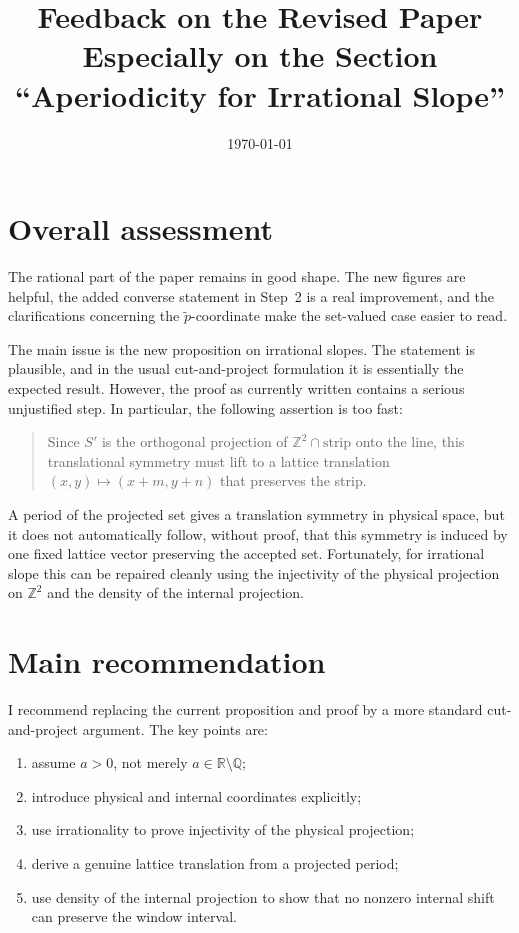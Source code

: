\documentclass[11pt]{article}
\title{Feedback on the Revised Paper\\
\large Especially on the Section ``Aperiodicity for Irrational Slope''}
\author{}
\date{\today}
\begin{document}
\maketitle

\section*{Overall assessment}

The rational part of the paper remains in good shape.  The new figures are
helpful, the added converse statement in Step~2 is a real improvement, and
the clarifications concerning the \(\tilde p\)-coordinate make the set-valued
case easier to read.

The main issue is the new proposition on irrational slopes.  The statement is
plausible, and in the usual cut-and-project formulation it is essentially the
expected result.  However, the proof as currently written contains a serious
unjustified step.  In particular, the following assertion is too fast:
\begin{quote}
Since \(S'\) is the orthogonal projection of \(\mathbb Z^2\cap\text{strip}\)
onto the line, this translational symmetry must lift to a lattice translation
\((x,y)\mapsto(x+m,y+n)\) that preserves the strip.
\end{quote}
A period of the projected set gives a translation symmetry in physical space,
but it does not automatically follow, without proof, that this symmetry is
induced by one fixed lattice vector preserving the accepted set.  Fortunately,
for irrational slope this can be repaired cleanly using the injectivity of the
physical projection on \(\mathbb Z^2\) and the density of the internal
projection.

\section*{Main recommendation}

I recommend replacing the current proposition and proof by a more standard
cut-and-project argument.  The key points are:
\begin{enumerate}[label=\arabic*.]
    \item assume \(a>0\), not merely \(a\in\mathbb R\setminus\mathbb Q\);
    \item introduce physical and internal coordinates explicitly;
    \item use irrationality to prove injectivity of the physical projection;
    \item derive a genuine lattice translation from a projected period;
    \item use density of the internal projection to show that no nonzero
          internal shift can preserve the window interval.
\end{enumerate}
\end{document}
